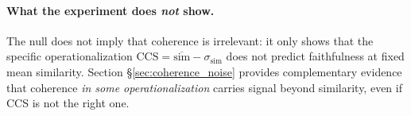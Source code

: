 \paragraph{What the experiment does \emph{not} show.}
The null does not imply that coherence is irrelevant: it only
shows that the specific operationalization $\mathrm{CCS} =
\overline{\mathrm{sim}} - \sigma_{\mathrm{sim}}$ does not predict
faithfulness at fixed mean similarity. Section
\S\ref{sec:coherence_noise} provides complementary evidence that
coherence \emph{in some operationalization} carries signal beyond
similarity, even if CCS is not the right one.
